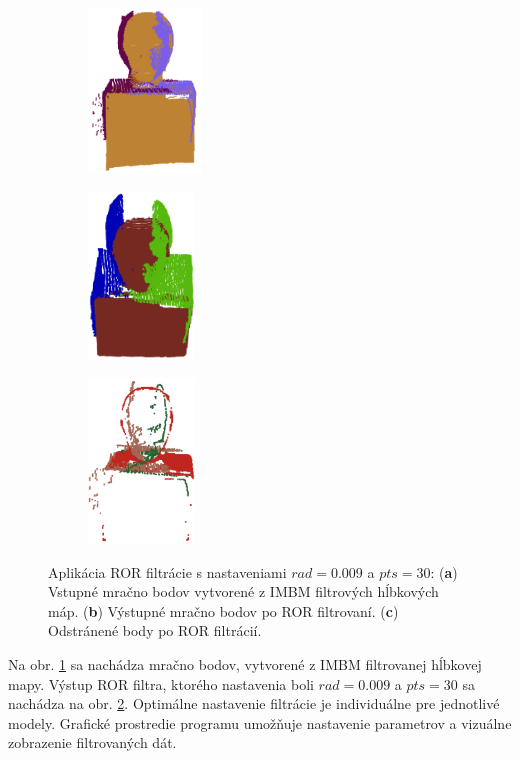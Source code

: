 \begin{figure}[h]
	\centering
	\begin{subfigure}[b]{0.32\textwidth}
		\centering
		\includegraphics[height=4.4cm]{figures/model_colors.png}
		\caption{}
		\label{fig:ror:a}
	\end{subfigure}
	\hfill
	\begin{subfigure}[b]{0.32\textwidth}
		\centering
		\includegraphics[height=4.4cm]{figures/ror_preserv.png}
		\caption{}
		\label{fig:ror:b}
	\end{subfigure}
	\hfill
	\begin{subfigure}[b]{0.32\textwidth}
		\centering
		\includegraphics[height=4.4cm]{figures/ror_rem.png}
		\caption{}
		\label{fig:ror:c}
	\end{subfigure}
	\caption{Aplikácia ROR filtrácie s nastaveniami $rad=0.009$ a  $pts=30$: (\textbf{a}) Vstupné mračno bodov vytvorené z IMBM filtrových hĺbkových máp. (\textbf{b}) Výstupné mračno bodov po ROR filtrovaní. (\textbf{c}) Odstránené body po ROR filtrácií.}
	\label{fig:ror}
\end{figure}

Na obr. \ref{fig:ror:a} sa nachádza mračno bodov, vytvorené z IMBM filtrovanej hĺbkovej mapy. Výstup ROR filtra, ktorého nastavenia boli $rad=0.009$ a $pts=30$ sa nachádza na obr. \ref{fig:ror:b}. Optimálne nastavenie filtrácie je individuálne pre jednotlivé modely. Grafické prostredie programu umožňuje nastavenie parametrov a vizuálne zobrazenie filtrovaných dát. 

